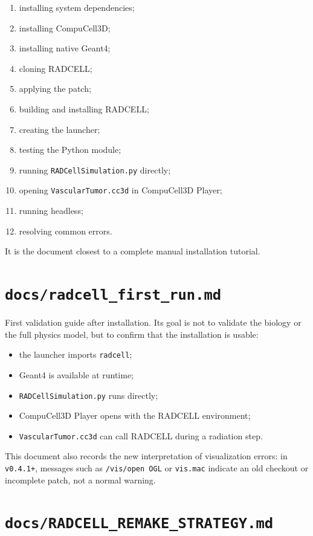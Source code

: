 \documentclass[11pt,a4paper,twoside,pdftex]{refrep}
\begin{document}
\begin{enumerate}
  \item installing system dependencies;
  \item installing CompuCell3D;
  \item installing native Geant4;
  \item cloning RADCELL;
  \item applying the patch;
  \item building and installing RADCELL;
  \item creating the launcher;
  \item testing the Python module;
  \item running \texttt{RADCellSimulation.py} directly;
  \item opening \texttt{VascularTumor.cc3d} in CompuCell3D Player;
  \item running headless;
  \item resolving common errors.
\end{enumerate}

It is the document closest to a complete manual installation tutorial.

\section{\texttt{docs/radcell\_first\_run.md}}

First validation guide after installation. Its goal is not to validate the biology or the full physics model, but to confirm that the installation is usable:

\begin{itemize}
  \item the launcher imports \texttt{radcell};
  \item Geant4 is available at runtime;
  \item \texttt{RADCellSimulation.py} runs directly;
  \item CompuCell3D Player opens with the RADCELL environment;
  \item \texttt{VascularTumor.cc3d} can call RADCELL during a radiation step.
\end{itemize}

This document also records the new interpretation of visualization errors: in \texttt{v0.4.1+}, messages such as \texttt{/vis/open OGL} or \texttt{vis.mac} indicate an old checkout or incomplete patch, not a normal warning.

\section{\texttt{docs/RADCELL\_REMAKE\_STRATEGY.md}}
\end{document}
